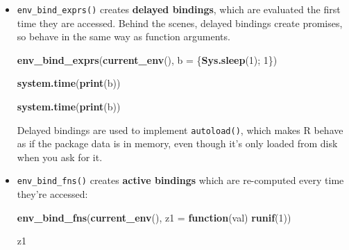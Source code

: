 \documentclass[]{book}
\newenvironment{Shaded}{\begin{snugshade}}{\end{snugshade}}
\newcommand{\KeywordTok}[1]{\textcolor[rgb]{0.13,0.29,0.53}{\textbf{#1}}}
\newcommand{\DataTypeTok}[1]{\textcolor[rgb]{0.13,0.29,0.53}{#1}}
\newcommand{\DecValTok}[1]{\textcolor[rgb]{0.00,0.00,0.81}{#1}}
\newcommand{\ControlFlowTok}[1]{\textcolor[rgb]{0.13,0.29,0.53}{\textbf{#1}}}
\newcommand{\NormalTok}[1]{#1}
\theoremstyle{definition}
\theoremstyle{definition}
\theoremstyle{definition}
\theoremstyle{remark}
\begin{document}
\begin{itemize}
\item
  \texttt{env\_bind\_exprs()} creates \textbf{delayed bindings}, which
  are evaluated the first time they are accessed. Behind the scenes,
  delayed bindings create promises, so behave in the same way as
  function arguments.

\begin{Shaded}
\begin{Highlighting}[]
\KeywordTok{env_bind_exprs}\NormalTok{(}\KeywordTok{current_env}\NormalTok{(), }\DataTypeTok{b =}\NormalTok{ \{}\KeywordTok{Sys.sleep}\NormalTok{(}\DecValTok{1}\NormalTok{); }\DecValTok{1}\NormalTok{\})}
\end{Highlighting}
\end{Shaded}

\begin{Shaded}
\begin{Highlighting}[]
\KeywordTok{system.time}\NormalTok{(}\KeywordTok{print}\NormalTok{(b))}
\end{Highlighting}
\end{Shaded}

\begin{Shaded}
\begin{Highlighting}[]
\KeywordTok{system.time}\NormalTok{(}\KeywordTok{print}\NormalTok{(b))}
\end{Highlighting}
\end{Shaded}

  Delayed bindings are used to implement \texttt{autoload()}, which
  makes R behave as if the package data is in memory, even though it's
  only loaded from disk when you ask for it.
\item
  \texttt{env\_bind\_fns()} creates \textbf{active bindings} which are
  re-computed every time they're accessed:

\begin{Shaded}
\begin{Highlighting}[]
\KeywordTok{env_bind_fns}\NormalTok{(}\KeywordTok{current_env}\NormalTok{(), }\DataTypeTok{z1 =} \ControlFlowTok{function}\NormalTok{(val) }\KeywordTok{runif}\NormalTok{(}\DecValTok{1}\NormalTok{))}
\end{Highlighting}
\end{Shaded}

\begin{Shaded}
\begin{Highlighting}[]
\NormalTok{z1}
\end{Highlighting}
\end{Shaded}


\end{itemize}
\end{document}
